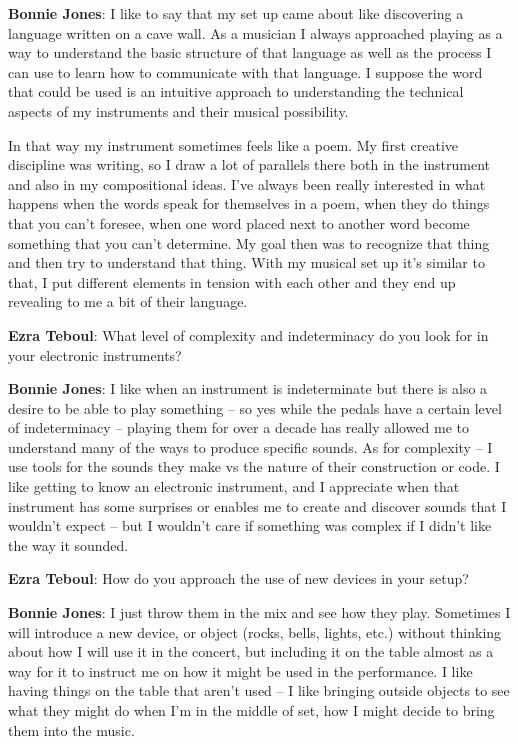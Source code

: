 \textbf{Bonnie Jones}: I like to say that my set up came about like discovering a language written on a cave wall. As a musician I always approached playing as a way to understand the basic structure of that language as well as the process I can use to learn how to communicate with that language. I suppose the word that could be used is an intuitive approach to understanding the technical aspects of my instruments and their musical possibility. 

In that way my instrument sometimes feels like a poem. My first creative discipline was writing, so I draw a lot of parallels there both in the instrument and also in my compositional ideas. I’ve always been really interested in what happens when the words speak for themselves in a poem, when they do things that you can’t foresee, when one word placed next to another word become something that you can’t determine. My goal then was to recognize that thing and then try to understand that thing. With my musical set up it’s similar to that, I put different elements in tension with each other and they end up revealing to me a bit of their language.

\textbf{Ezra Teboul}: What level of complexity and indeterminacy do you look for in your electronic instruments? 

\textbf{Bonnie Jones}: I like when an instrument is indeterminate but there is also a desire to be able to play something – so yes while the pedals have a certain level of indeterminacy – playing them for over a decade has really allowed me to understand many of the ways to produce specific sounds. As for complexity – I use tools for the sounds they make vs the nature of their construction or code. I like getting to know an electronic instrument, and I appreciate when that instrument has some surprises or enables me to create and discover sounds that I wouldn’t expect – but I wouldn’t care if something was complex if I didn’t like the way it sounded. 


\textbf{Ezra Teboul}: How do you approach the use of new devices in your setup? 

\textbf{Bonnie Jones}: I just throw them in the mix and see how they play. Sometimes I will introduce a new device, or object (rocks, bells, lights, etc.) without thinking about how I will use it in the concert, but including it on the table almost as a way for it to instruct me on how it might be used in the performance. I like having things on the table that aren’t used – I like bringing outside objects to see what they might do when I’m in the middle of set, how I might decide to bring them into the music.

